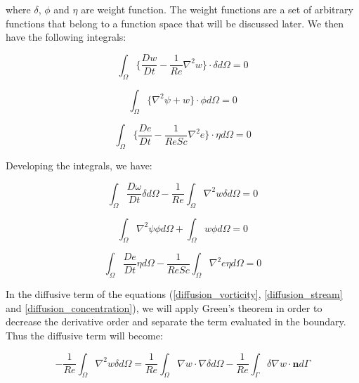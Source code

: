 \noindent
where $\delta$, $\phi$ and $\eta$ are weight function.
The weight functions are a set of arbitrary functions 
that belong to a function space that will be discussed later. 
We then have the following integrals:

\begin{equation}
 \int_{\Omega} \Bigg\{ 
 \frac{D w}{D t}
 -
 \frac{1}{Re} \nabla^{2} w
\Bigg\} \cdot \delta d\Omega = 0
\end{equation}

\begin{equation}
 \int_{\Omega} \big\{ \nabla^2 \psi + w \big\} \cdot \phi d\Omega = 0
\end{equation}

\begin{equation}
 \int_{\Omega} \Bigg\{ 
 \frac{D e}{Dt}
 -
 \frac{1}{ReSc} \nabla^{2} e
 \Bigg\} \cdot \eta d\Omega = 0
\end{equation}



\noindent
Developing the integrals, we have:

\begin{equation} \label{diffusion_vorticity} 
   \int_{\Omega} \frac{D \omega}{Dt} \delta d\Omega 
 - \frac{1}{\textit{Re}} \int_{\Omega} \nabla^2 w \delta d\Omega
 = 0
\end{equation}

\begin{equation} \label{diffusion_stream}
   \int_{\Omega} \nabla^2 \psi \phi d\Omega
 + \int_{\Omega} w \phi d\Omega = 0
\end{equation}

\begin{equation} \label{diffusion_concentration} 
   \int_{\Omega} \frac{D e}{Dt} \eta d\Omega
 - \frac{1}{\textit{ReSc}} \int_{\Omega} \nabla^2 e \eta d\Omega 
 = 0
\end{equation}

\medskip
In the diffusive term of the equations (\ref{diffusion_vorticity}, \ref{diffusion_stream} and \ref{diffusion_concentration}),
we will apply Green's theorem in order to decrease 
the derivative order and separate the term evaluated in the boundary. 
Thus the diffusive term will become:

\begin{equation} \label{diffusion2_vorticity} 
 - \frac{1}{\textit{Re}} \int_{\Omega} \nabla^2 w \delta d\Omega
 = \frac{1}{\textit{Re}} \int_{\Omega} \nabla w \cdot \nabla \delta d\Omega
 - \frac{1}{\textit{Re}} \int_{\Gamma} \delta \nabla w \cdot \textbf{n} d\Gamma
\end{equation}

